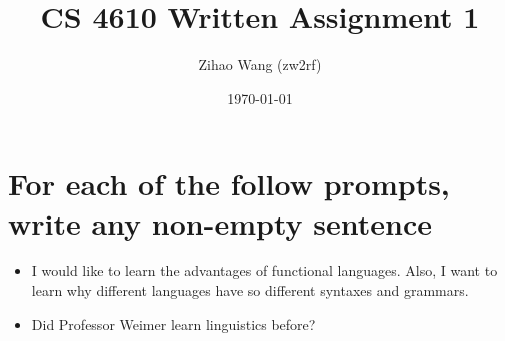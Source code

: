 \documentclass[11pt]{article}
\begin{document}
\thispagestyle{empty}
\title{CS 4610 Written Assignment 1}
\author{Zihao Wang (zw2rf)}
\date{\today}
\maketitle
\doublespacing

\section{For each of the follow prompts, write any non-empty sentence}
\begin{itemize}
\item I would like to learn the advantages of functional languages. Also, I want to learn why different languages have so different syntaxes and grammars. 
\item Did Professor Weimer learn linguistics before?
\end{itemize}
\end{document}
